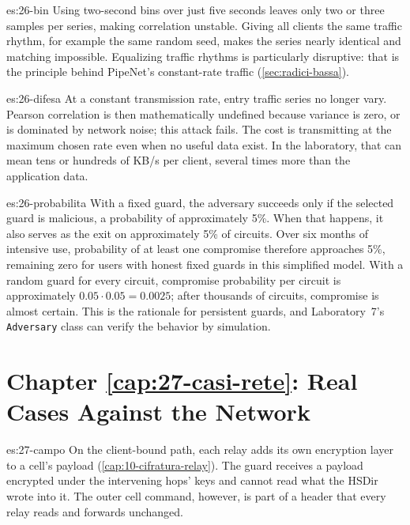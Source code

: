 \begin{soluzione}{es:26-bin}
Using two-second bins over just five seconds leaves only two or three samples per series, making correlation unstable. Giving all clients the same traffic rhythm, for example the same random seed, makes the series nearly identical and matching impossible. Equalizing traffic rhythms is particularly disruptive: that is the principle behind PipeNet's constant-rate traffic (\cref{sec:radici-bassa}).
\end{soluzione}

\begin{soluzione}{es:26-difesa}
At a constant transmission rate, entry traffic series no longer vary. Pearson correlation is then mathematically undefined because variance is zero, or is dominated by network noise; this attack fails. The cost is transmitting at the maximum chosen rate even when no useful data exist. In the laboratory, that can mean tens or hundreds of KB/s per client, several times more than the application data.
\end{soluzione}

\begin{soluzione}{es:26-probabilita}
With a fixed guard, the adversary succeeds only if the selected guard is malicious, a probability of approximately 5\%. When that happens, it also serves as the exit on approximately 5\% of circuits. Over six months of intensive use, probability of at least one compromise therefore approaches 5\%, remaining zero for users with honest fixed guards in this simplified model. With a random guard for every circuit, compromise probability per circuit is approximately $0.05 \cdot 0.05 = 0.0025$; after thousands of circuits, compromise is almost certain. This is the rationale for persistent guards, and Laboratory~7's \texttt{Adversary} class can verify the behavior by simulation.
\end{soluzione}

\section*{Chapter \ref{cap:27-casi-rete}: Real Cases Against the Network}

\begin{soluzione}{es:27-campo}
On the client-bound path, each relay adds its own encryption layer to a cell's payload (\cref{cap:10-cifratura-relay}). The guard receives a payload encrypted under the intervening hops' keys and cannot read what the HSDir wrote into it. The outer cell command, however, is part of a header that every relay reads and forwards unchanged.
\end{soluzione}

